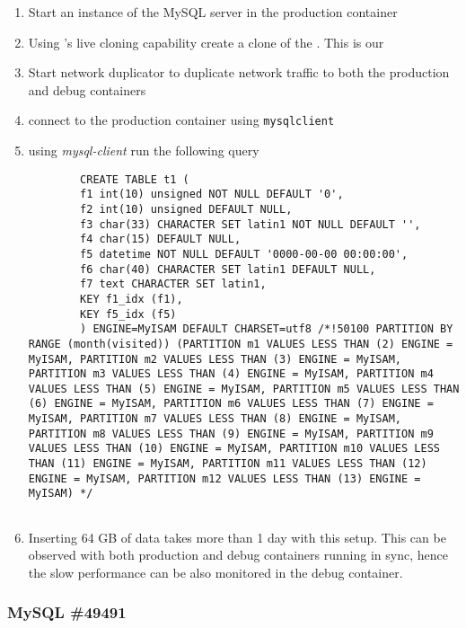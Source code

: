 \begin{adjustwidth}{0.5cm}{}
	\begin{enumerate}
		\item Start an instance of the MySQL server in the production container
		\item Using \parikshan's live cloning capability create a clone of the \productioncontainer. This is our \debugcontainer
		\item Start network duplicator to duplicate network traffic to both the production and debug containers
		\item connect to the production container using \texttt{mysqlclient}
		\item using \emph{mysql-client} run the following query
		
		\begin{lstlisting}
		CREATE TABLE t1 (
		f1 int(10) unsigned NOT NULL DEFAULT '0',
		f2 int(10) unsigned DEFAULT NULL,
		f3 char(33) CHARACTER SET latin1 NOT NULL DEFAULT '',
		f4 char(15) DEFAULT NULL,
		f5 datetime NOT NULL DEFAULT '0000-00-00 00:00:00',
		f6 char(40) CHARACTER SET latin1 DEFAULT NULL,
		f7 text CHARACTER SET latin1,
		KEY f1_idx (f1),
		KEY f5_idx (f5)
		) ENGINE=MyISAM DEFAULT CHARSET=utf8 /*!50100 PARTITION BY RANGE (month(visited)) (PARTITION m1 VALUES LESS THAN (2) ENGINE = MyISAM, PARTITION m2 VALUES LESS THAN (3) ENGINE = MyISAM, PARTITION m3 VALUES LESS THAN (4) ENGINE = MyISAM, PARTITION m4 VALUES LESS THAN (5) ENGINE = MyISAM, PARTITION m5 VALUES LESS THAN (6) ENGINE = MyISAM, PARTITION m6 VALUES LESS THAN (7) ENGINE = MyISAM, PARTITION m7 VALUES LESS THAN (8) ENGINE = MyISAM, PARTITION m8 VALUES LESS THAN (9) ENGINE = MyISAM, PARTITION m9 VALUES LESS THAN (10) ENGINE = MyISAM, PARTITION m10 VALUES LESS THAN (11) ENGINE = MyISAM, PARTITION m11 VALUES LESS THAN (12) ENGINE = MyISAM, PARTITION m12 VALUES LESS THAN (13) ENGINE = MyISAM) */
		
		\end{lstlisting}
		
		\item Inserting 64 GB of data takes more than 1 day with this setup. This can be observed with both production and debug containers running in sync, hence the slow performance can be also monitored in the debug container.
		
	\end{enumerate}
\end{adjustwidth}	


\subsubsection{MySQL \#49491}

